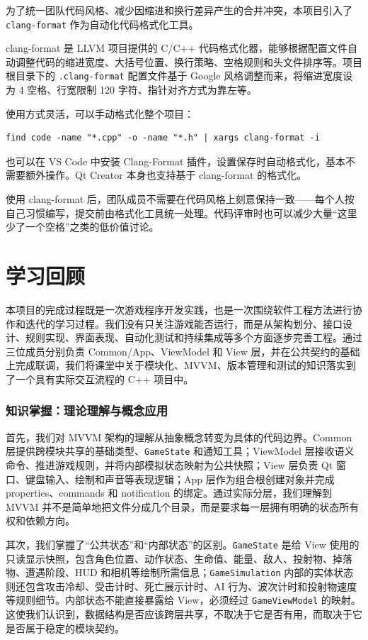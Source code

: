 \documentclass[a4paper]{article}
\begin{document}
为了统一团队代码风格、减少因缩进和换行差异产生的合并冲突，本项目引入了 \texttt{clang-format} 作为自动化代码格式化工具。

clang-format 是 LLVM 项目提供的 C/C++ 代码格式化器，能够根据配置文件自动调整代码的缩进宽度、大括号位置、换行策略、空格规则和头文件排序等。项目根目录下的 \texttt{.clang-format} 配置文件基于 Google 风格调整而来，将缩进宽度设为 4 空格、行宽限制 120 字符、指针对齐方式为靠左等。

使用方式灵活，可以手动格式化整个项目：

\begin{verbatim}
find code -name "*.cpp" -o -name "*.h" | xargs clang-format -i
\end{verbatim}

也可以在 VS Code 中安装 Clang-Format 插件，设置保存时自动格式化，基本不需要额外操作。Qt Creator 本身也支持基于 clang-format 的格式化。

使用 clang-format 后，团队成员不需要在代码风格上刻意保持一致——每个人按自己习惯编写，提交前由格式化工具统一处理。代码评审时也可以减少大量“这里少了一个空格”之类的低价值讨论。

\section{学习回顾}
本项目的完成过程既是一次游戏程序开发实践，也是一次围绕软件工程方法进行协作和迭代的学习过程。我们没有只关注游戏能否运行，而是从架构划分、接口设计、规则实现、界面表现、自动化测试和持续集成等多个方面逐步完善工程。通过三位成员分别负责 Common/App、ViewModel 和 View 层，并在公共契约的基础上完成联调，我们将课堂中关于模块化、MVVM、版本管理和测试的知识落实到了一个具有实际交互流程的 C++ 项目中。

\subsubsection{知识掌握：理论理解与概念应用}

首先，我们对 MVVM 架构的理解从抽象概念转变为具体的代码边界。Common 层提供跨模块共享的基础类型、\texttt{GameState} 和通知工具；ViewModel 层接收语义命令、推进游戏规则，并将内部模拟状态映射为公共快照；View 层负责 Qt 窗口、键盘输入、绘制和声音等表现逻辑；App 层作为组合根创建对象并完成 properties、commands 和 notification 的绑定。通过实际分层，我们理解到 MVVM 并不是简单地把文件分成几个目录，而是要求每一层拥有明确的状态所有权和依赖方向。

其次，我们掌握了“公共状态”和“内部状态”的区别。\texttt{GameState} 是给 View 使用的只读显示快照，包含角色位置、动作状态、生命值、能量、敌人、投射物、掉落物、遭遇阶段、HUD 和相机等绘制所需信息；\texttt{GameSimulation} 内部的实体状态则还包含攻击冷却、受击计时、死亡展示计时、AI 行为、波次计时和投射物速度等规则细节。内部状态不能直接暴露给 View，必须经过 \texttt{GameViewModel} 的映射。这使我们认识到，数据结构是否应该跨层共享，不取决于它是否有用，而取决于它是否属于稳定的模块契约。
\end{document}
